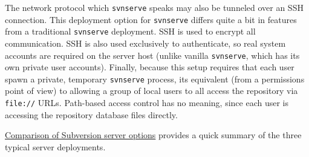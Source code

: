 The network protocol which \texttt{svnserve} speaks may also be tunneled
over an SSH connection. This deployment option for \texttt{svnserve}
differs quite a bit in features from a traditional \texttt{svnserve}
deployment. SSH is used to encrypt all communication. SSH is also used
exclusively to authenticate, so real system accounts are required on the
server host (unlike vanilla \texttt{svnserve}, which has its own private
user accounts). Finally, because this setup requires that each user
spawn a private, temporary \texttt{svnserve} process,
it\textquotesingle s equivalent (from a permissions point of view) to
allowing a group of local users to all access the repository via
\texttt{file://} URLs. Path-based access control has no meaning, since
each user is accessing the repository database files directly.

\hyperref[svn.serverconfig.overview.tbl-1]{Comparison of Subversion
server options} provides a quick summary of the three typical server
deployments.

